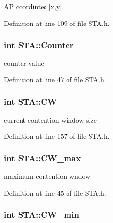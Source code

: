 \hyperlink{classAP}{A\-P} coordintes \mbox{[}x,y\mbox{]}. 



Definition at line 109 of file S\-T\-A.\-h.

\hypertarget{classSTA_ac8a769972c9e523e988f60c75254d215}{
\subsubsection[{Counter}]{\setlength{\rightskip}{0pt plus 5cm}int S\-T\-A\-::\-Counter\hspace{0.3cm}{\ttfamily [private]}}}\label{classSTA_ac8a769972c9e523e988f60c75254d215}


counter value 



Definition at line 47 of file S\-T\-A.\-h.

\hypertarget{classSTA_add0683c8927abd74b422d88844a00602}{
\subsubsection[{C\-W}]{\setlength{\rightskip}{0pt plus 5cm}int S\-T\-A\-::\-C\-W}}\label{classSTA_add0683c8927abd74b422d88844a00602}


current contention window size 



Definition at line 157 of file S\-T\-A.\-h.

\hypertarget{classSTA_ac341bce4f378ac00fd29b69a44b75dee}{
\subsubsection[{C\-W\-\_\-max}]{\setlength{\rightskip}{0pt plus 5cm}int S\-T\-A\-::\-C\-W\-\_\-max\hspace{0.3cm}{\ttfamily [private]}}}\label{classSTA_ac341bce4f378ac00fd29b69a44b75dee}


maximum contention wndow 



Definition at line 45 of file S\-T\-A.\-h.

\hypertarget{classSTA_ab466517298fbdaa0efd8532646930dfd}{
\subsubsection[{C\-W\-\_\-min}]{\setlength{\rightskip}{0pt plus 5cm}int S\-T\-A\-::\-C\-W\-\_\-min\hspace{0.3cm}{\ttfamily [private]}}}\label{classSTA_ab466517298fbdaa0efd8532646930dfd}


